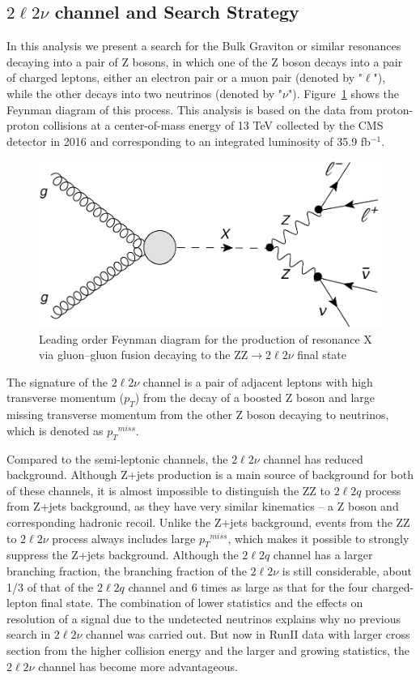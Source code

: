 \subsection{$2\ell 2\nu$ channel and  Search Strategy}
In this analysis we present a search for the Bulk Graviton or similar resonances decaying into a pair of Z bosons, in which one of the Z boson decays into a pair of charged leptons, either an electron pair or a muon pair (denoted by "$\ell$"), while the other decays into two neutrinos (denoted by "$\nu$"). Figure~\ref{fig:intro_llnndiagram} shows the Feynman diagram of this process. This analysis is based on the data from proton-proton collisions at a center-of-mass energy of 13 TeV collected by the CMS detector in 2016 and corresponding to an integrated luminosity of 35.9 fb$^{-1}$. 
\begin{figure}[htbp]
\begin{center}
\includegraphics[width=0.72\linewidth]{figures/intro_llnndiagram.pdf}
\caption{Leading order Feynman diagram for the production of resonance X via gluon–gluon fusion decaying to the ZZ$\rightarrow 2\ell 2\nu$ final state}
\label{fig:intro_llnndiagram}
\end{center}
\end{figure}
The signature of the  $2\ell 2\nu$ channel is a pair of adjacent leptons with high transverse momentum ($p_T$) from the decay of a boosted Z boson and large missing transverse momentum from the other Z boson decaying to neutrinos, which is denoted as ${p_{T}}^{miss}$.

\vspace{0.3cm}
Compared to the semi-leptonic channels, the $2\ell 2\nu$ channel has reduced background. Although Z+jets production is a main source of background for both of these channels, it is almost impossible to distinguish the ZZ to $2\ell 2q$ process from Z+jets background, as they have very similar kinematics -- a Z boson and corresponding hadronic recoil. Unlike the Z+jets background, events from the ZZ to $2\ell 2\nu$ process always includes large ${p_{T}}^{miss}$, which makes it possible to strongly suppress the Z+jets background. Although the $2\ell 2q$ channel has a larger branching fraction, the branching fraction of the $2\ell 2\nu$ is still considerable, about 1/3 of that of the $2\ell 2q$ channel and 6 times as large as that for the four charged-lepton final state. The combination of lower statistics and the effects on resolution of a signal due to the undetected neutrinos explains why no previous search in $2\ell 2\nu$ channel was carried out. But now in RunII data with larger cross section from the higher collision energy and the larger and growing statistics, the $2\ell 2\nu$ channel has become more advantageous.

